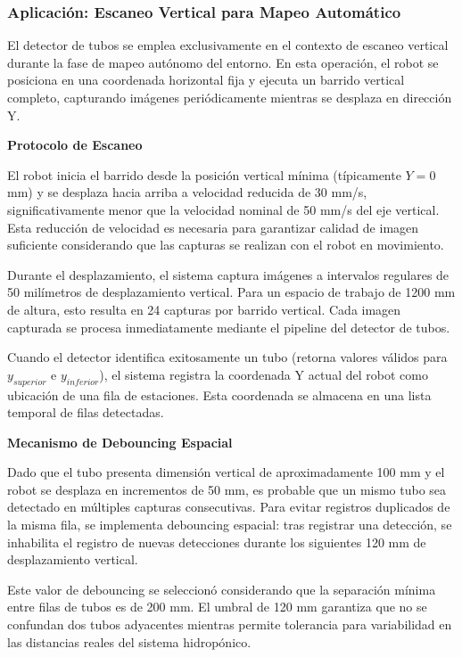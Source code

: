 \subsubsection{Aplicación: Escaneo Vertical para Mapeo Automático}

El detector de tubos se emplea exclusivamente en el contexto de escaneo vertical durante la fase de mapeo autónomo del entorno. En esta operación, el robot se posiciona en una coordenada horizontal fija y ejecuta un barrido vertical completo, capturando imágenes periódicamente mientras se desplaza en dirección Y.

\textbf{Protocolo de Escaneo}

El robot inicia el barrido desde la posición vertical mínima (típicamente $Y = 0$ mm) y se desplaza hacia arriba a velocidad reducida de 30 mm/s, significativamente menor que la velocidad nominal de 50 mm/s del eje vertical. Esta reducción de velocidad es necesaria para garantizar calidad de imagen suficiente considerando que las capturas se realizan con el robot en movimiento.

Durante el desplazamiento, el sistema captura imágenes a intervalos regulares de 50 milímetros de desplazamiento vertical. Para un espacio de trabajo de 1200 mm de altura, esto resulta en 24 capturas por barrido vertical. Cada imagen capturada se procesa inmediatamente mediante el pipeline del detector de tubos.

Cuando el detector identifica exitosamente un tubo (retorna valores válidos para $y_{superior}$ e $y_{inferior}$), el sistema registra la coordenada Y actual del robot como ubicación de una fila de estaciones. Esta coordenada se almacena en una lista temporal de filas detectadas.

\textbf{Mecanismo de Debouncing Espacial}

Dado que el tubo presenta dimensión vertical de aproximadamente 100 mm y el robot se desplaza en incrementos de 50 mm, es probable que un mismo tubo sea detectado en múltiples capturas consecutivas. Para evitar registros duplicados de la misma fila, se implementa debouncing espacial: tras registrar una detección, se inhabilita el registro de nuevas detecciones durante los siguientes 120 mm de desplazamiento vertical.

Este valor de debouncing se seleccionó considerando que la separación mínima entre filas de tubos es de 200 mm. El umbral de 120 mm garantiza que no se confundan dos tubos adyacentes mientras permite tolerancia para variabilidad en las distancias reales del sistema hidropónico.

